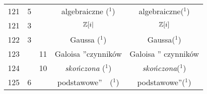 \documentclass[a4paper,11pt]{article}
\begin{document}
\begin{center}
\begin{tabular}{|c|c|c|c|c|}
    121 &  5 & & algebraiczne ($^{ 1 }$) & algebraiczne($^{ 1 }$) \\
    121 &  3 & & $\mathbb{Z}[ i |$ & $\mathbb{Z}[ i ]$ \\
    122 &  3 & & Gaussa ($^{ 1 }$) & Gaussa($^{ 1 }$) \\
    123 & & 11 & Galoisa ”czynników  & Galoisa ” czynników \\
    124 & & 10 & \textit{skończona} ($^{ 1 }$)
           & \textit{skończona}($^{ 1 }$) \\
    125 &  6 & & podstawowe”~~($^{ 1 }$) & podstawowe”($^{ 1 }$) \\
    \hline
  \end{tabular}





  \newpage


\end{center}
\end{document}
